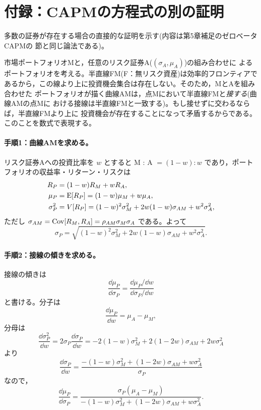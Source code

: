 \section*{付録：CAPMの方程式の別の証明}

多数の証券が存在する場合の直接的な証明を示す(内容は第5章補足のゼロベータCAPMの
節と同じ論法である)。

市場ポートフォリオMと，任意のリスク証券A($(\sigma_A,\mu_A)$)の組み合わせに
よるポートフォリオを考える。半直線FM(F：無リスク資産)は効率的フロンティアで
あるから，この線より上に投資機会集合は存在しない。そのため，MとAを組み合わせた
ポートフォリオが描く曲線AMは，点Mにおいて半直線FMと\emph{接する}(曲線AMの点Mに
おける接線は半直線FMと一致する)。もし接せずに交わるならば，半直線FMより上に
投資機会が存在することになって矛盾するからである。このことを数式で表現する。

\paragraph{手順1：曲線AMを求める。}
リスク証券Aへの投資比率を $w$ とすると M : A $= (1-w) : w$ であり，ポート
フォリオの収益率・リターン・リスクは
\begin{align}
R_P &= (1-w)R_M + wR_A,\\
\mu_P &= \mathrm{E}[R_P] = (1-w)\mu_M + w\mu_A,\\
\sigma_P^2 &= V[R_P] = (1-w)^2\sigma_M^2 + 2w(1-w)\sigma_{AM} + w^2\sigma_A^2,
\end{align}
ただし $\sigma_{AM} = \mathrm{Cov}[R_M,R_A] = \rho_{AM}\sigma_M\sigma_A$ である。よって
\begin{equation}
\sigma_P = \sqrt{(1-w)^2\sigma_M^2 + 2w(1-w)\sigma_{AM} + w^2\sigma_A^2}.
\end{equation}

\paragraph{手順2：接線の傾きを求める。}
接線の傾きは
\[
\frac{\dd\mu_P}{\dd\sigma_P} = \frac{\dd\mu_P/\dd w}{\dd\sigma_P/\dd w}
\]
と書ける。分子は
\[
\frac{\dd\mu_P}{\dd w} = \mu_A - \mu_M,
\]
分母は
\[
\frac{\dd\sigma_P^2}{\dd w} = 2\sigma_P\frac{\dd\sigma_P}{\dd w}
= -2(1-w)\sigma_M^2 + 2(1-2w)\sigma_{AM} + 2w\sigma_A^2
\]
より
\[
\frac{\dd\sigma_P}{\dd w}
= \frac{-(1-w)\sigma_M^2 + (1-2w)\sigma_{AM} + w\sigma_A^2}{\sigma_P}
\]
なので，
\begin{equation}
\frac{\dd\mu_P}{\dd\sigma_P}
= \frac{\sigma_P(\mu_A - \mu_M)}
{-(1-w)\sigma_M^2 + (1-2w)\sigma_{AM} + w\sigma_A^2}.
\end{equation}


